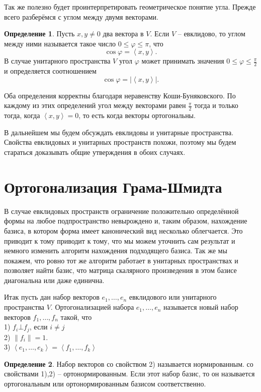 \documentclass[10pt,a4paper,oneside]{book}
\theoremstyle{definition}
\newtheorem*{defn}{Определение}
\def\ffi{\varphi}
\def\lan{\left\langle }
\def\ran{\right\rangle}
\def\dfn{\begin{defn}}
\def\edfn{\end{defn}}
\begin{document}
Так же полезно будет проинтерпретировать геометрическое понятие угла. Прежде всего разберёмся с углом между двумя векторами.

\dfn Пусть $x,y\neq 0$ два вектора в $V$. Если $V$ -- евклидово, то углом между ними называется такое число $0\leq\ffi\leq \pi$, что 
$$\cos\ffi = \lan x,y\ran.$$
В случае унитарного пространства $V$ угол $\ffi$ может принимать значения $0\leq \ffi \leq \frac{\pi}{2}$ и определяется соотношением
$$\cos\ffi = |\lan x,y\ran|.$$
\edfn

Оба определения корректны благодаря неравенству Коши-Буняковского. По каждому из этих определений угол между векторами равен $\frac{\pi}{2}$ тогда и только тогда, когда $\lan x,y 
\ran=0$, то есть когда векторы ортогональны. 

В дальнейшем мы будем обсуждать  евклидовы и унитарные пространства. Свойства евклидовых и унитарных пространств похожи, поэтому  мы будем стараться доказывать общие утверждения в обоих случаях.


\section{Ортогонализация Грама-Шмидта}

В случае евклидовых пространств ограничение положительно определённой формы на любое подпространство невырождено и, таким образом, нахождение базиса, в котором форма имеет канонический вид несколько облегчается.  Это приводит к тому приводит к тому, что мы можем уточнить сам результат и немного изменить алгоритм нахождения подходящего базиса. Так же мы покажем, что ровно тот же алгоритм работает в унитарных пространствах и позволяет найти базис, что матрица скалярного произведения в этом базисе диагональна или даже единична.

Итак пусть дан набор векторов $e_1,\dots, e_n $ евклидового или унитарного пространства $V$. Ортогонализацией набора $e_1,\dots,e_n$ называется  новый набор векторов $f_1,\dots,f_n$ такой, что\\
1) $f_i \bot f_j$, если $i\neq j$\\
2) $\|f_i\|=1$.\\
3) $\lan e_1,\dots,e_k\ran=\lan f_1,\dots,f_k\ran$\\


\dfn Набор векторов со свойством 2)
называется нормированным. со свойствами 1),2) -- ортонормированным. Если этот набор базис, то он называется ортогональным или ортонормированным базисом соответственно.
\edfn 
\end{document}
